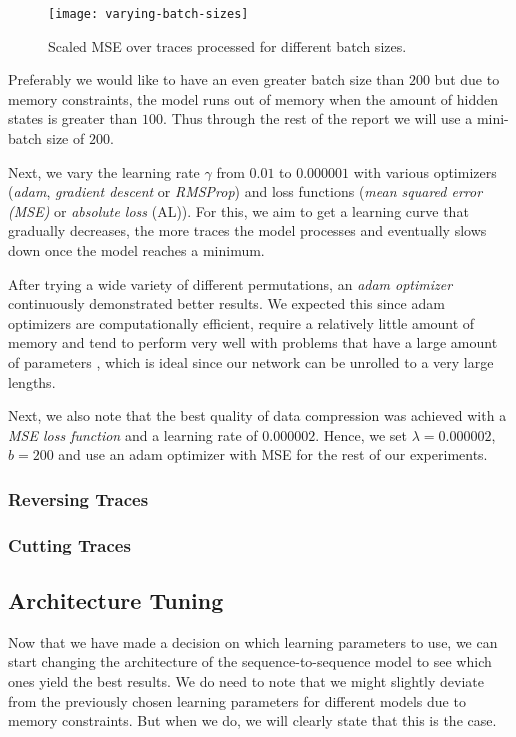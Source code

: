 \begin{figure}[ht]
  \centering
  \texttt{[image: varying-batch-sizes]}
  \caption{Scaled MSE over traces processed for different batch sizes.}
  \label{fig:varying-batch-sizes}
\end{figure}

Preferably we would like to have an even greater batch size than $200$ but due to memory constraints, the model runs out of memory when the amount of hidden states is greater than $100$.
Thus through the rest of the report we will use a mini-batch size of $200$.

Next, we vary the learning rate $\gamma$ from $0.01$ to $0.000001$ with various optimizers (\textit{adam}, \textit{gradient descent} or \textit{RMSProp}) and loss functions (\textit{mean squared error (MSE)} or \textit{absolute loss} (AL)).
For this, we aim to get a learning curve that gradually decreases, the more traces the model processes and eventually slows down once the model reaches a minimum.

After trying a wide variety of different permutations, an \textit{adam optimizer} continuously demonstrated better results.
We expected this since adam optimizers are computationally efficient, require a relatively little amount of memory and tend to perform very well with problems that have a large amount of parameters \cite{kingma2014adam},
which is ideal since our network can be unrolled to a very large lengths.

Next, we also note that the best quality of data compression was achieved with a \textit{MSE loss function} and a learning rate of $0.000002$.
Hence, we set $\lambda = 0.000002$, $b = 200$ and use an adam optimizer with MSE for the rest of our experiments.

\subsubsection{Reversing Traces}

\subsubsection{Cutting Traces}

\subsection{Architecture Tuning}

Now that we have made a decision on which learning parameters to use, we can start changing the architecture of the sequence-to-sequence model to see which ones yield the best results.
We do need to note that we might slightly deviate from the previously chosen learning parameters for different models due to memory constraints.
But when we do, we will clearly state that this is the case.

